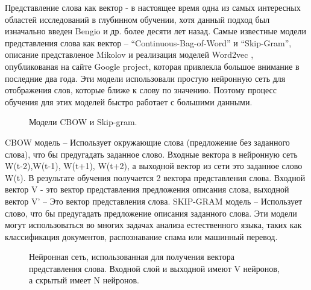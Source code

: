 \documentclass[12pt]{article}
\begin{document}
Представление слова как вектор - в настоящее время одна из самых интересных областей исследований в глубинном обучении, хотя данный подход был изначально введен Bengio \cite{Bengio} и др. более десяти лет назад. Самые известные модели представления слова как вектор – “Continuous-Bag-of-Word” и “Skip-Gram”, описание представленое Mikolov\cite{Mikolov} и реализация моделей Word2vec \cite{word2vec}, опубликованая на сайте Google project, которая привлекла большое внимание в последние два года. Эти модели использовали простую нейронную сеть для отображения слов, которые ближе к слову по значению. Поэтому процесс обучения для этих моделей быстро работает с большими данными. 
	
	\begin{figure}[H]
		\noindent{}
		\caption{Модели CBOW и Skip-gram.}
		\label{figCurves}
	\end{figure}
	
CBOW модель – Использует окружающие слова (предложение без заданного слова), что бы предугадать заданное слово. Входные вектора в нейронную сеть W(t-2),W(t-1), W(t+1), W(t+2), а выходной вектор из сети это заданное слово W(t). В результате обучения получается 2 вектора представления слова. Входной вектор V - это вектор представления предложения описания слова, выходной вектор V’ – Это вектор представления слова. SKIP-GRAM модель – Использует слово, что бы предугадать предложение описания заданного слова. Эти модели могут использоваться во многих задачах анализа естественного языка, таких как классификация документов, распознавание спама или машинный перевод.

 	\begin{figure}[H]
		\noindent{}
		\caption{Нейронная сеть, использованная для получения вектора представления слова. Входной слой и выходной имеют V нейронов, а скрытый имеет N нейронов.}
		\label{figCurves}
	\end{figure}
\end{document}
